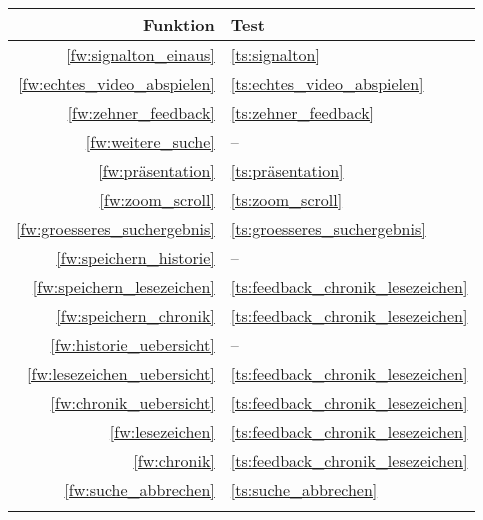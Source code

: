 \begin{minipage}[t]{0.28\textwidth}
\begin{tabular}{r | l}
Funktion & Test \\
\hline
\ref{fw:signalton_einaus} & \ref{ts:signalton} \\
\ref{fw:echtes_video_abspielen} & \ref{ts:echtes_video_abspielen} \\
\ref{fw:zehner_feedback} & \ref{ts:zehner_feedback} \\
\ref{fw:weitere_suche} & -- \\
\ref{fw:präsentation} & \ref{ts:präsentation} \\
\ref{fw:zoom_scroll} & \ref{ts:zoom_scroll} \\
\ref{fw:groesseres_suchergebnis} & \ref{ts:groesseres_suchergebnis} \\
\ref{fw:speichern_historie} & -- \\
\ref{fw:speichern_lesezeichen} & \ref{ts:feedback_chronik_lesezeichen} \\
\ref{fw:speichern_chronik} & \ref{ts:feedback_chronik_lesezeichen} \\
\ref{fw:historie_uebersicht} & -- \\
\ref{fw:lesezeichen_uebersicht} & \ref{ts:feedback_chronik_lesezeichen} \\
\ref{fw:chronik_uebersicht} & \ref{ts:feedback_chronik_lesezeichen} \\
\ref{fw:lesezeichen} & \ref{ts:feedback_chronik_lesezeichen} \\
\ref{fw:chronik} & \ref{ts:feedback_chronik_lesezeichen} \\
\ref{fw:suche_abbrechen} & \ref{ts:suche_abbrechen} \\
 &  \\
\end{tabular}
\end{minipage}
\pagebreak
